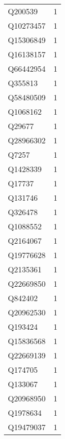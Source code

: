 \begin{tabular}{lr}
     Q200539 &                             1 \\
   Q10273457 &                             1 \\
   Q15306849 &                             1 \\
   Q16138157 &                             1 \\
   Q66442954 &                             1 \\
     Q355813 &                             1 \\
   Q58480509 &                             1 \\
    Q1068162 &                             1 \\
      Q29677 &                             1 \\
   Q28966302 &                             1 \\
       Q7257 &                             1 \\
    Q1428339 &                             1 \\
      Q17737 &                             1 \\
     Q131746 &                             1 \\
     Q326478 &                             1 \\
    Q1088552 &                             1 \\
    Q2164067 &                             1 \\
   Q19776628 &                             1 \\
    Q2135361 &                             1 \\
   Q22669850 &                             1 \\
     Q842402 &                             1 \\
   Q20962530 &                             1 \\
     Q193424 &                             1 \\
   Q15836568 &                             1 \\
   Q22669139 &                             1 \\
     Q174705 &                             1 \\
     Q133067 &                             1 \\
   Q20968950 &                             1 \\
    Q1978634 &                             1 \\
   Q19479037 &                             1 \\

\end{tabular}
